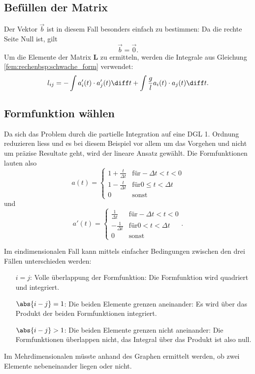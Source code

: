 \subsection{Befüllen der Matrix}
Der Vektor $\vec{b}$ ist in diesem Fall besonders einfach zu bestimmen: Da die rechte Seite Null ist, gilt
\begin{equation}
    \vec{b} = \vec{0}.
\end{equation}
Um die Elemente der Matrix $\mathbf{L}$ zu ermitteln, werden die Integrale aus Gleichung \ref{fem:rechenbsp:schwache_form} verwendet:
\begin{equation}
    l_{ij} = - \int a_i'(t) \cdot a_j'(t) \diff t + \int \frac{g}{l} a_i(t) \cdot a_j(t) \diff t.
\end{equation}


\subsection{Formfunktion wählen}
Da sich das Problem durch die partielle Integration auf eine DGL 1. Ordnung reduzieren liess und es bei diesem Beispiel vor allem um das Vorgehen und nicht um präzise Resultate geht, wird der lineare Ansatz gewählt.
Die Formfunktionen lauten also 
\begin{equation}
    a(t) = \left\{ \begin{array}{ll}
        1+\frac{t}{\Delta t} & \mbox{für} -\Delta t < t < 0 \\
        1-\frac{t}{\Delta t} & \mbox{für} 0 \leq t < \Delta t \\
        0 & \mbox{sonst}
    \end{array} \right.
\end{equation}
und
\begin{equation}
    a'(t) = \left\{ \begin{array}{ll}
        \frac{1}{\Delta t} & \mbox{für} -\Delta t < t < 0 \\
        -\frac{1}{\Delta t} & \mbox{für} 0 < t < \Delta t \\
        0 & \mbox{sonst}
    \end{array} \right. .
\end{equation}

Im eindimensionalen Fall kann mittels einfacher Bedingungen zwischen den drei Fällen unterschieden werden:
\begin{itemize}
    \item[$i = j$:] Volle überlappung der Formfunktion: Die Formfunktion wird quadriert und integriert. 
    \item[$\abs{i - j} = 1$:] Die beiden Elemente grenzen aneinander: Es wird über das Produkt der beiden Formfunktionen integriert.
    \item[$\abs{i - j} > 1$:] Die beiden Elemente grenzen nicht aneinander: Die Formfunktionen überlappen nicht, das Integral über das Produkt ist also null.
\end{itemize}
Im Mehrdimensionalen müsste anhand des Graphen ermittelt werden, ob zwei Elemente nebeneinander liegen oder nicht.

